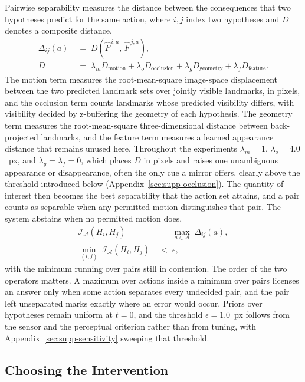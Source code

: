 \documentclass{article} %
\theoremstyle{defstyle}
\theoremstyle{plain}
\begin{document}
Pairwise separability measures the distance between the consequences that two hypotheses
predict for the same action, where $i,j$ index two hypotheses and $D$ denotes a composite
distance,
\begin{align}
\label{eq:separability}
\Delta_{ij}(a) \;&=\; D\!\left(\hat{F}^{\,i,a},\, \hat{F}^{\,j,a}\right), \\
\label{eq:distance}
D \;&=\; \lambda_m D_{\text{motion}} + \lambda_o D_{\text{occlusion}}
      + \lambda_g D_{\text{geometry}} + \lambda_f D_{\text{feature}} .
\end{align}
The motion term measures the root-mean-square image-space displacement between the two
predicted landmark sets over jointly visible landmarks, in pixels, and the occlusion term
counts landmarks whose predicted visibility differs, with visibility decided by z-buffering
the geometry of each hypothesis. The geometry term measures the root-mean-square
three-dimensional distance between back-projected landmarks, and the feature term measures a
learned appearance distance that remains unused here. Throughout the experiments
$\lambda_m = 1$, $\lambda_o = 4.0$~px, and $\lambda_g = \lambda_f = 0$, which places $D$ in
pixels and raises one unambiguous appearance or disappearance, often the only cue a mirror
offers, clearly above the threshold introduced below (Appendix~\ref{sec:supp-occlusion}).
The quantity of interest then becomes the best separability that the action set attains, and
a pair counts as separable when any permitted motion distinguishes that pair. The system
abstains when no permitted motion does,
\begin{align}
\label{eq:identifiability}
\mathcal{I}_{\mathcal{A}}\!\left(H_i, H_j\right)
\;&=\; \max_{a \in \mathcal{A}} \; \Delta_{ij}(a), \\
\label{eq:abstain}
\min_{(i,j)} \; \mathcal{I}_{\mathcal{A}}\!\left(H_i, H_j\right) \;&<\; \epsilon ,
\end{align}
with the minimum running over pairs still in contention. The order of the two operators
matters. A maximum over actions inside a minimum over pairs licenses an answer only when
some action separates every undecided pair, and the pair left unseparated marks exactly
where an error would occur. Priors over hypotheses remain uniform at $t = 0$, and the
threshold $\epsilon = 1.0$~px follows from the sensor and the perceptual criterion rather
than from tuning, with Appendix~\ref{sec:supp-sensitivity} sweeping that threshold.

\subsection{Choosing the Intervention}
\label{sec:selection}
\end{document}
